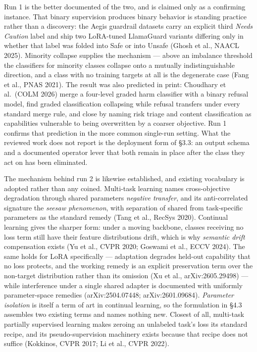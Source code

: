 Run 1 is the better documented of the two, and is claimed only as a confirming instance.
That binary supervision produces binary behavior is standing practice rather than a discovery: the
Aegis guardrail datasets carry an explicit third \emph{Needs Caution} label and ship two LoRA-tuned
LlamaGuard variants differing only in whether that label was folded into Safe or into Unsafe (Ghosh
et al., NAACL 2025). Minority collapse supplies the mechanism --- above an imbalance threshold the
classifiers for minority classes collapse onto a mutually indistinguishable direction, and a class
with no training targets at all is the degenerate case (Fang et al., PNAS 2021). The result was also
predicted in print: Choudhary et al.~(COLM 2026) merge a four-level graded harm classifier with a
binary refusal model, find graded classification collapsing while refusal transfers under every
standard merge rule, and close by naming risk triage and content classification as capabilities
vulnerable to being overwritten by a coarser objective. Run 1 confirms that prediction in the more
common single-run setting. What the reviewed work does not report is the deployment form of §3.3: an
output schema and a documented operator lever that both remain in place after the class they act on
has been eliminated.

The mechanism behind run 2 is likewise established, and existing vocabulary is adopted rather than
any coined. Multi-task learning names cross-objective degradation through shared
parameters \emph{negative transfer}, and its anti-correlated signature the \emph{seesaw phenomenon}, with
separation of shared from task-specific parameters as the standard remedy (Tang et al., RecSys 2020).
Continual learning gives the sharper form: under a moving backbone, classes receiving no loss term
still have their feature distributions drift, which is why \emph{semantic drift} compensation exists (Yu
et al., CVPR 2020; Goswami et al., ECCV 2024). The same holds for LoRA specifically --- adaptation
degrades held-out capability that no loss protects, and the working remedy is an explicit
preservation term over the non-target distribution rather than its omission (Xu et al.,
arXiv:2605.29498) --- while interference under a single shared adapter is documented with uniformly
parameter-space remedies (arXiv:2504.07448; arXiv:2601.09684). \emph{Parameter isolation} is itself a term
of art in continual learning, so the formulation in §4.3 assembles two existing terms and names
nothing new. Closest of all, multi-task partially supervised learning makes zeroing an unlabeled
task's loss its standard recipe, and its pseudo-supervision machinery exists because that recipe does
not suffice (Kokkinos, CVPR 2017; Li et al., CVPR 2022).

